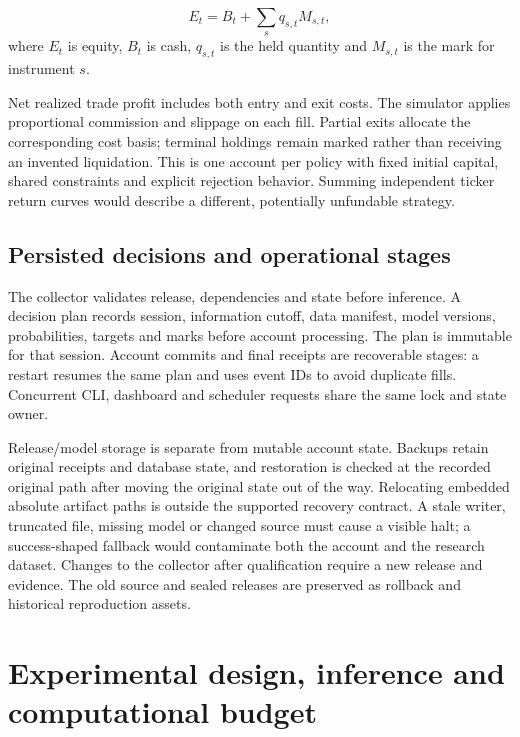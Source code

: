 \documentclass[11pt,a4paper]{article}
\begin{document}
\begin{equation}\label{eq:equity}E_t=B_t+\sum_s q_{s,t}M_{s,t},\end{equation}\noindent where $E_t$ is equity, $B_t$ is cash, $q_{s,t}$ is the held quantity and $M_{s,t}$ is the mark for instrument $s$.

Net realized trade profit includes both entry and exit costs. The simulator applies proportional commission and slippage on each fill. Partial exits allocate the corresponding cost basis; terminal holdings remain marked rather than receiving an invented liquidation. This is one account per policy with fixed initial capital, shared constraints and explicit rejection behavior. Summing independent ticker return curves would describe a different, potentially unfundable strategy.

\subsection{Persisted decisions and operational stages}

The collector validates release, dependencies and state before inference. A decision plan records session, information cutoff, data manifest, model versions, probabilities, targets and marks before account processing. The plan is immutable for that session. Account commits and final receipts are recoverable stages: a restart resumes the same plan and uses event IDs to avoid duplicate fills. Concurrent CLI, dashboard and scheduler requests share the same lock and state owner.

Release/model storage is separate from mutable account state. Backups retain original receipts and database state, and restoration is checked at the recorded original path after moving the original state out of the way. Relocating embedded absolute artifact paths is outside the supported recovery contract. A stale writer, truncated file, missing model or changed source must cause a visible halt; a success-shaped fallback would contaminate both the account and the research dataset. Changes to the collector after qualification require a new release and evidence. The old source and sealed releases are preserved as rollback and historical reproduction assets.


\section{Experimental design, inference and computational budget}\label{sec:section-05}
\end{document}
